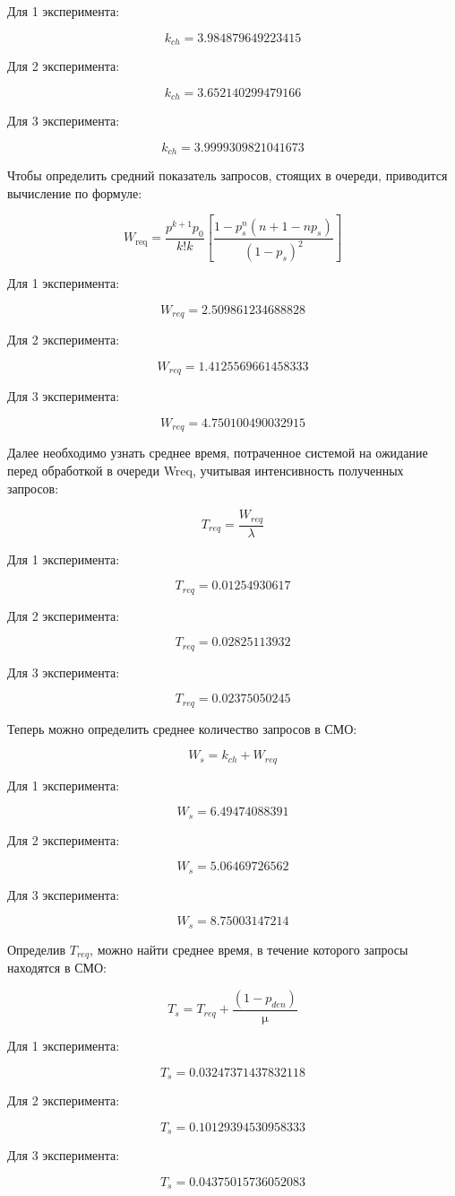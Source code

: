 Для 1 эксперимента:

$$k_{ch} = 3.984879649223415$$

Для 2 эксперимента:

$$k_{ch} = 3.652140299479166$$

Для 3 эксперимента:

$$k_{ch} = 3.9999309821041673$$

Чтобы определить средний показатель запросов, стоящих в очереди,
приводится вычисление по формуле:

$$W_{\text{req}} = \frac{p^{k+1} p_0}{k!k} \left[ \frac{1 - p_s^n (n + 1 - n p_s)}{(1 - p_s)^2} \right]$$

Для 1 эксперимента:

$$W_{req} = 2.509861234688828$$

Для 2 эксперимента:

$$W_{req} = 1.4125569661458333$$

Для 3 эксперимента:

$$W_{req} = 4.750100490032915$$

Далее необходимо узнать среднее время, потраченное системой на
ожидание перед обработкой в очереди Wreq, учитывая интенсивность
полученных запросов:

$$T_{req} = \frac{W_{req}}{\lambda}$$

Для 1 эксперимента:

$$T_{req} = 0.01254930617$$

Для 2 эксперимента:

$$T_{req} = 0.02825113932$$

Для 3 эксперимента:

$$T_{req} = 0.02375050245$$

Теперь можно определить среднее количество запросов в СМО:

$$W_s = k_{ch} + W_{req}$$

Для 1 эксперимента:

$$W_s = 6.49474088391$$

Для 2 эксперимента:

$$W_s = 5.06469726562$$

Для 3 эксперимента:

$$W_s = 8.75003147214$$

Определив $T_{req}$, можно найти среднее время, в течение которого запросы
находятся в СМО:

$$T_s = T_{req} + \frac{(1-p_{den})}{\upmu}$$

Для 1 эксперимента:

$$T_s = 0.03247371437832118$$

Для 2 эксперимента:

$$T_s = 0.10129394530958333$$

Для 3 эксперимента:

$$T_s = 0.04375015736052083$$


